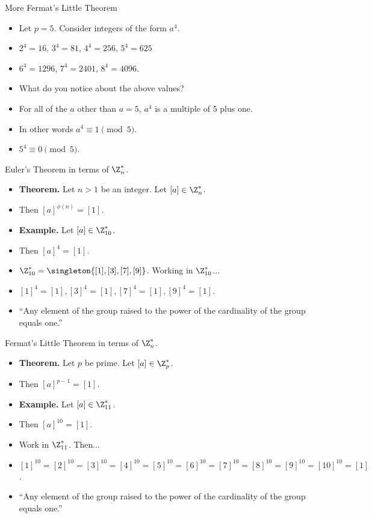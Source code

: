 \documentclass[handout]{beamer}
\begin{document}
\begin{frame}{More Fermat's Little Theorem}

\begin{itemize}
  \item Let $p=5$. Consider integers of the form $a^4$.
  \item $2^4=16$, $3^4=81$, $4^4=256$, $5^4=625$
  \item $6^4=1296$,  $7^4=2401$, $8^4=4096$.
  \item What do you notice about the above values?
  \item For all of the $a$ other than $a=5$, $a^4$ is a multiple of 5 plus one.
  \item In other words $a^4 \equiv 1 \pmod 5$.
  \item $5^4 \equiv 0 \pmod {5}$.
\end{itemize}

\end{frame}

\begin{frame}{Euler's Theorem in terms of $\Z_n^*$.}
\begin{itemize}
  \item \textbf{Theorem.} Let $n>1$ be an integer. Let $[a]\in\Z_n^*$.
  \item Then $[a]^{\phi(n)} = [1]$.
  \item \textbf{Example.} Let $[a]\in\Z_{10}^*$.
  \item Then $[a]^4 = [1]$.
  \item $\Z^*_{10} = \singleton{[1],[3],[7],[9]}$. Working in $\Z^*_{10}$...
  \item $[1]^4=[1], [3]^4=[1], [7]^4 = [1], [9]^4 = [1]$.
  \item ``Any element of the group raised to the power of the cardinality of the group equals one.''
\end{itemize}

\end{frame}

\begin{frame}{Fermat's Little Theorem in terms of $\Z_n^*$.}
\begin{itemize}
  \item \textbf{Theorem.} Let $p$ be prime. Let $[a]\in\Z_p^*$.
  \item Then $[a]^{p-1} = [1]$.
  \item \textbf{Example.} Let $[a]\in\Z_{11}^*$.
  \item Then $[a]^{10} = [1]$.
  \item Work in $\Z^*_{11}$. Then...
  \item $[1]^{10}=[2]^{10}=[3]^{10} = [4]^{10} = [5]^{10}=[6]^{10}=[7]^{10}=[8]^{10} = [9]^{10}=[10]^{10} = [1]$.
  \item ``Any element of the group raised to the power of the cardinality of the group equals one.''
\end{itemize}

\end{frame}
\end{document}

